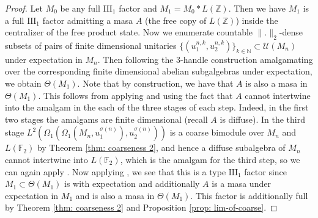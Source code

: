 \documentclass[10pt]{amsart}
\numberwithin{equation}{section}
\theoremstyle{definition}
\begin{document}
\begin{proof}
    Let $M_0$ be any full I$\mathrm{II}_1$ factor and $M_1=M_0*L(\mathbb{Z})$. Then we have $M_1$ is a full I$\mathrm{II}_1$ factor admitting a masa $A$ (the free copy of $L(\mathbb{Z})$) inside the centralizer of the free product state. Now we enumerate countable $\|.\|_2$-dense subsets of pairs of finite dimensional unitaries $\{(u_1^{n,k},u_2^{n,k})\}_{k\in\mathbb N}\subset \mathcal{U}(M_n)$ under expectation in $M_n$. Then following the 3-handle construction amalgamating over the corresponding finite dimensional abelian subgalgebras under expectation, we obtain $\Theta(M_1)$. Note that by construction, we have that $A$ is also a masa in $\Theta(M_1)$. This follows from applying \cite[Proposition 3.3]{Ueda_2013} and using the fact that $A$ cannot intertwine into the amalgam in the each of the three stages of each step. Indeed, in the first two stages the amalgams are finite dimensional (recall $A$ is diffuse).  In the third stage $L^2(\Omega_1(\Omega_1(M_n,u_1^{\sigma(n)}),u_2^{\sigma(n)}))$ is a coarse bimodule over $M_n$ and $L(\mathbb{F}_2)$ by Theorem \ref{thm: coarseness 2}, and hence a diffuse subalgebra of $M_n$ cannot intertwine into $L(\mathbb{F}_2)$, which is the amalgam for the third step, so we can again apply \cite[Proposition 3.3]{Ueda_2013}.  Now applying \cite[Proposition 2.7]{Ando_2019}, we see that this is a type $\mathrm{III}_1$ factor since $M_1\subset \Theta(M_1)$ is with expectation and additionally $A$ is a masa under expectation in $M_1$ and is also a masa in $\Theta(M_1)$. This factor is additionally full by Theorem \ref{thm: coarseness 2} and Proposition \ref{prop: lim-of-coarse}. 
\end{proof}
\end{document}

